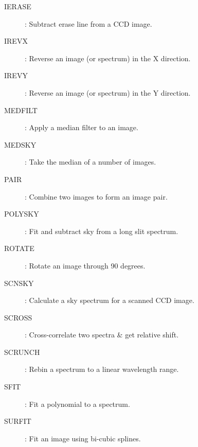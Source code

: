 \begin {description}
\begin{description}
\begin{description}
\item [IERASE]: Subtract erase line from a CCD image.
\item [IREVX]: Reverse an image (or spectrum) in the X direction.
\item [IREVY]: Reverse an image (or spectrum) in the Y direction.
\item [MEDFILT]: Apply a median filter to an image.
\item [MEDSKY]: Take the median of a number of images.
\item [PAIR]: Combine two images to form an image pair.
\item [POLYSKY]: Fit and subtract sky from a long slit spectrum.
\item [ROTATE]: Rotate an image through 90 degrees.
\item [SCNSKY]: Calculate a sky spectrum for a scanned CCD image.
\item [SCROSS]: Cross-correlate two spectra \& get relative shift.
\item [SCRUNCH]: Rebin a spectrum to a linear wavelength range.
\item [SFIT]: Fit a polynomial to a spectrum.
\item [SURFIT]: Fit an image using bi-cubic splines.
\end{description}


\end{description}
\end{description}
